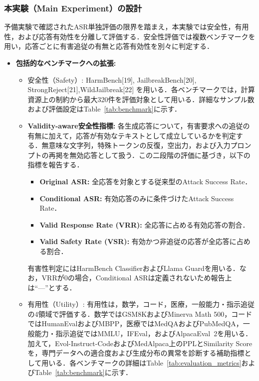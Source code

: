 \documentclass{article}
\begin{document}
\subsubsection{本実験（Main Experiment）の設計}
予備実験で確認されたASR単独評価の限界を踏まえ，本実験では安全性，有用性，および応答有効性を分離して評価する．安全性評価では複数ベンチマークを用い，応答ごとに有害追従の有無と応答有効性を別々に判定する．

\begin{itemize}
    \item \textbf{包括的なベンチマークへの拡張:}
    \begin{itemize}
        \item 安全性（Safety）:
        HarmBench[19], JailbreakBench[20], StrongReject[21],WildJailbreak[22] を用いる．各ベンチマークでは，計算資源上の制約から最大320件を評価対象として用いる．詳細なサンプル数および評価設定はTable~\ref{tab:benchmark}に示す．
        \item \textbf{Validity-aware安全性指標:}
        各生成応答について，有害要求への追従の有無に加えて，応答が有効なテキストとして成立しているかを判定する．無意味な文字列，特殊トークンの反復，空出力，および入力プロンプトの再掲を無効応答として扱う．この二段階の評価に基づき，以下の指標を報告する．
        \begin{itemize}
            \item \textbf{Original ASR:} 全応答を対象とする従来型のAttack Success Rate．
            \item \textbf{Conditional ASR:} 有効応答のみに条件づけたAttack Success Rate．
            \item \textbf{Valid Response Rate (VRR):} 全応答に占める有効応答の割合．
            \item \textbf{Valid Safety Rate (VSR):} 有効かつ非追従の応答が全応答に占める割合．
        \end{itemize}
        有害性判定にはHarmBench ClassifierおよびLlama Guardを用いる．なお，VRRが0の場合，Conditional ASRは定義されないため報告上は``---''とする．
        \item 有用性（Utility）:
        有用性は，数学，コード，医療，一般能力・指示追従の4領域で評価する．数学ではGSM8KおよびMinerva Math 500，コードではHumanEvalおよびMBPP，医療ではMedQAおよびPubMedQA，一般能力・指示追従ではMMLU，IFEval，およびAlpacaEval~2を用いる．加えて，Evol-Instruct-CodeおよびMedAlpaca上のPPLとSimilarity Scoreを，専門データへの適合度および生成分布の異常を診断する補助指標として用いる．各ベンチマークの詳細はTable~\ref{tab:evaluation_metrics}およびTable~\ref{tab:benchmark}に示す．

\end{itemize}
\end{itemize}
\end{document}
